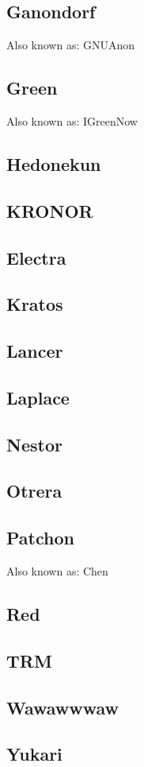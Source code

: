 \documentclass[12pt]{report}
\begin{document}
{\subsection{Ganondorf}
Also known as: GNUAnon
\subsection{Green}
Also known as: IGreenNow
\subsection{Hedonekun}
\subsection{KRONOR}
\subsection{Electra}
\subsection{Kratos}
\subsection{Lancer}
\subsection{Laplace}
\subsection{Nestor}
\subsection{Otrera}
\subsection{Patchon}
Also known as: Chen
\subsection{Red}
\subsection{TRM}
\subsection{Wawawwwaw}
\subsection{Yukari}
}
\end{document}

